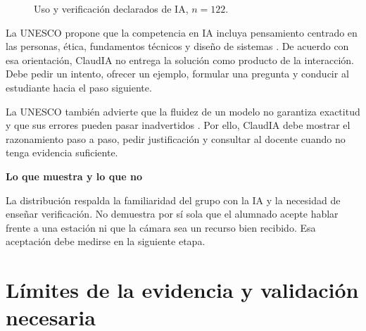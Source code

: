 \documentclass[letterpaper,11pt]{article}
\newcommand{\shortsection}[1]{\par\noindent\textbf{\fontsize{11}{19}\selectfont #1}\par}
\begin{document}
\begin{figure}[H]
\centering
{}
\caption{Uso y verificación declarados de IA, $n=122$.}
\end{figure}

La UNESCO propone que la competencia en IA incluya pensamiento centrado en las personas, ética, fundamentos técnicos y diseño de sistemas \cite{miao2024}. De acuerdo con esa orientación, ClaudIA no entrega la solución como producto de la interacción. Debe pedir un intento, ofrecer un ejemplo, formular una pregunta y conducir al estudiante hacia el paso siguiente.

La UNESCO también advierte que la fluidez de un modelo no garantiza exactitud y que sus errores pueden pasar inadvertidos \cite{unesco2024guide}. Por ello, ClaudIA debe mostrar el razonamiento paso a paso, pedir justificación y consultar al docente cuando no tenga evidencia suficiente.

\shortsection{Lo que muestra y lo que no}
La distribución respalda la familiaridad del grupo con la IA y la necesidad de enseñar verificación. No demuestra por sí sola que el alumnado acepte hablar frente a una estación ni que la cámara sea un recurso bien recibido. Esa aceptación debe medirse en la siguiente etapa.

\clearpage

\section{Límites de la evidencia y validación necesaria}
\end{document}
